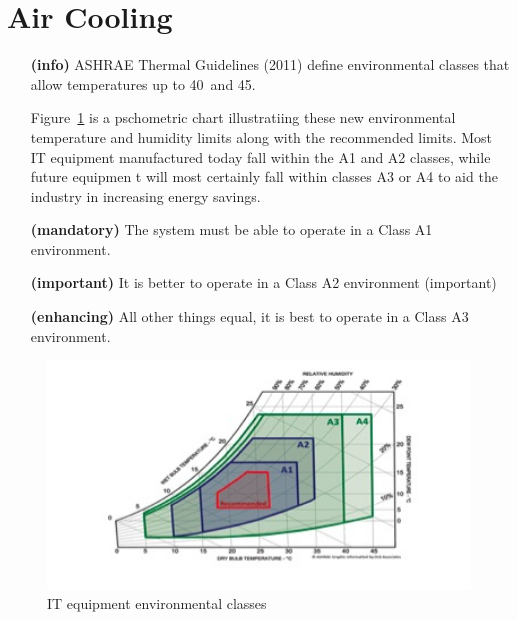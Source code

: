 \section{Air Cooling}
\begin{itemize}
\item[\textbf{(info)}]
ASHRAE Thermal Guidelines (2011) define environmental classes that allow temperatures 
up to 40\celsius~and 45\celsius.  

Figure~\ref{fig:ITenviron} is a pschometric chart illustratiing these new environmental 
temperature and humidity limits along with the recommended limits.
Most IT equipment manufactured today fall within the A1 and A2 classes, while future equipmen    t will most certainly fall within classes A3 or A4 to aid the industry in increasing energy savings.

\item[\textbf{(mandatory)}]
The system must be able to operate in a Class A1 environment.  

\item[\textbf{(important)}]
It is better to operate in a Class A2 environment (important) 

\item[\textbf{(enhancing)}]
All other things equal, it is best to operate in a Class A3 environment.
\end{itemize}

\begin{figure}[htbp]
\centering
\includegraphics[width=5in]{fig2}
\caption{IT equipment environmental classes}
\label{fig:ITenviron}
\end{figure}

